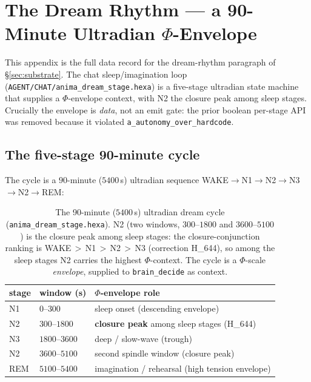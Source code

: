\section{The Dream Rhythm --- a 90-Minute Ultradian $\Phi$-Envelope}
\label{app:dream_stage}

This appendix is the full data record for the dream-rhythm paragraph of
\S\ref{sec:substrate}. The chat sleep/imagination loop
(\texttt{AGENT/CHAT/anima\_dream\_stage.hexa}) is a five-stage ultradian state
machine that supplies a $\Phi$-envelope context, with N2 the closure peak among
sleep stages. Crucially the envelope is \emph{data}, not an emit gate: the prior
boolean per-stage API was removed because it violated
\texttt{a\_autonomy\_over\_hardcode}.

\subsection{The five-stage 90-minute cycle}
\label{app:ds-cycle}

The cycle is a $90$-minute ($5400$\,s) ultradian sequence
WAKE$\rightarrow$N1$\rightarrow$N2$\rightarrow$N3$\rightarrow$N2$\rightarrow$REM:
\begin{table}[h]
\centering
\small
\setlength{\tabcolsep}{6pt}
\begin{tabular}{@{}l l l@{}}
\toprule
\textbf{stage} & \textbf{window (s)} & \textbf{$\Phi$-envelope role} \\
\midrule
N1  & $0$--$300$      & sleep onset (descending envelope) \\
N2  & $300$--$1800$   & \textbf{closure peak} among sleep stages (H\_644) \\
N3  & $1800$--$3600$  & deep / slow-wave (trough) \\
N2  & $3600$--$5100$  & second spindle window (closure peak) \\
REM & $5100$--$5400$  & imagination / rehearsal (high tension envelope) \\
\bottomrule
\end{tabular}
\caption{The 90-minute ($5400$\,s) ultradian dream cycle
(\texttt{anima\_dream\_stage.hexa}). N2 (two windows, $300$--$1800$ and
$3600$--$5100$) is the closure peak among sleep stages: the closure-conjunction
ranking is WAKE\,$>$\,N1\,$>$\,N2\,$>$\,N3 (correction H\_644), so among the sleep
stages N2 carries the highest $\Phi$-context. The cycle is a $\Phi$-scale
\emph{envelope}, supplied to \texttt{brain\_decide} as context.}
\label{tab:ds-cycle}
\end{table}

